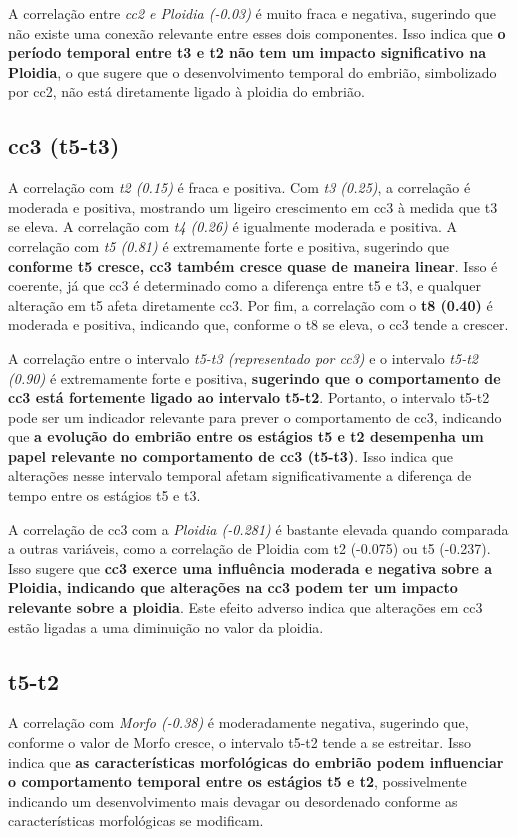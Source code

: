 A correlação entre \textit{cc2 e Ploidia (-0.03)} é muito fraca e negativa, sugerindo que não existe uma conexão relevante entre esses dois componentes. Isso indica que \textbf{o período temporal entre t3 e t2 não tem um impacto significativo na Ploidia}, o que sugere que o desenvolvimento temporal do embrião, simbolizado por cc2, não está diretamente ligado à ploidia do embrião.

\subsection*{cc3 (t5-t3)}
A correlação com \textit{t2 (0.15)} é fraca e positiva. Com \textit{t3 (0.25)}, a correlação é moderada e positiva, mostrando um ligeiro crescimento em cc3 à medida que t3 se eleva. A correlação com \textit{t4 (0.26)} é igualmente moderada e positiva. A correlação com \textit{t5 (0.81)} é extremamente forte e positiva, sugerindo que \textbf{conforme t5 cresce, cc3 também cresce quase de maneira linear}. Isso é coerente, já que cc3 é determinado como a diferença entre t5 e t3, e qualquer alteração em t5 afeta diretamente cc3. Por fim, a correlação com o \textbf{t8 (0.40)} é moderada e positiva, indicando que, conforme o t8 se eleva, o cc3 tende a crescer.

A correlação entre o intervalo \textit{t5-t3 (representado por cc3)} e o intervalo \textit{t5-t2 (0.90)} é extremamente forte e positiva, \textbf{sugerindo que o comportamento de cc3 está fortemente ligado ao intervalo t5-t2}. Portanto, o intervalo t5-t2 pode ser um indicador relevante para prever o comportamento de cc3, indicando que \textbf{a evolução do embrião entre os estágios t5 e t2 desempenha um papel relevante no comportamento de cc3 (t5-t3)}. Isso indica que alterações nesse intervalo temporal afetam significativamente a diferença de tempo entre os estágios t5 e t3. 

A correlação de cc3 com a \textit{Ploidia (-0.281)} é bastante elevada quando comparada a outras variáveis, como a correlação de Ploidia com t2 (-0.075) ou t5 (-0.237). Isso sugere que \textbf{cc3 exerce uma influência moderada e negativa sobre a Ploidia, indicando que alterações na cc3 podem ter um impacto relevante sobre a ploidia}. Este efeito adverso indica que alterações em cc3 estão ligadas a uma diminuição no valor da ploidia.

\subsection*{t5-t2}
A correlação com \textit{Morfo (-0.38)} é moderadamente negativa, sugerindo que, conforme o valor de Morfo cresce, o intervalo t5-t2 tende a se estreitar. Isso indica que \textbf{as características morfológicas do embrião podem influenciar o comportamento temporal entre os estágios t5 e t2}, possivelmente indicando um desenvolvimento mais devagar ou desordenado conforme as características morfológicas se modificam.

